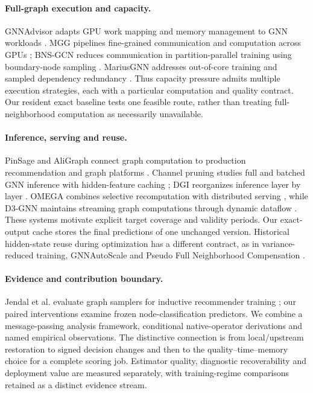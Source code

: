 \documentclass[sigconf, nonacm]{acmart}
\begin{document}
\paragraph{Full-graph execution and capacity.}
GNNAdvisor adapts GPU work mapping and memory management to GNN workloads \cite{wang2021gnnadvisor}. MGG pipelines fine-grained communication and computation across GPUs \cite{wang2023mgg}; BNS-GCN reduces communication in partition-parallel training using boundary-node sampling \cite{wan2022bnsgcn}. MariusGNN addresses out-of-core training and sampled dependency redundancy \cite{waleffe2023mariusgnn}. Thus capacity pressure admits multiple execution strategies, each with a particular computation and quality contract. Our resident exact baseline tests one feasible route, rather than treating full-neighborhood computation as necessarily unavailable.

\paragraph{Inference, serving and reuse.}
PinSage and AliGraph connect graph computation to production recommendation and graph platforms \cite{ying2018pinsage,zhu2019aligraph}. Channel pruning studies full and batched GNN inference with hidden-feature caching \cite{zhou2021channel}; DGI reorganizes inference layer by layer \cite{yin2022dgi}. OMEGA combines selective recomputation with distributed serving \cite{kim2026omega}, while D3-GNN maintains streaming graph computations through dynamic dataflow \cite{guliyev2024d3gnn}. These systems motivate explicit target coverage and validity periods. Our exact-output cache stores the final predictions of one unchanged version. Historical hidden-state reuse during optimization has a different contract, as in variance-reduced training, GNNAutoScale and Pseudo Full Neighborhood Compensation \cite{chen2018stochastic,fey2021gnnautoscale,zhou2025faster}.

\paragraph{Evidence and contribution boundary.}
Jendal et al. evaluate graph samplers for inductive recommender training \cite{jendal2025limits}; our paired interventions examine frozen node-classification predictors. We combine a message-passing analysis framework, conditional native-operator derivations and named empirical observations. The distinctive connection is from local/upstream restoration to signed decision changes and then to the quality--time--memory choice for a complete scoring job. Estimator quality, diagnostic recoverability and deployment value are measured separately, with training-regime comparisons retained as a distinct evidence stream.
\end{document}

